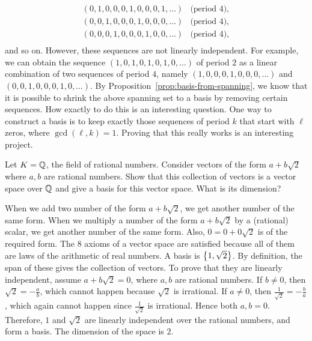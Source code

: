 \begin{ex}
\begin{sol}
\begin{enumerate}
\begin{equation*}
\begin{array}{ll}
          (0,1,0,0,0,1,0,0,0,1,\ldots) & \mbox{(period $4$)},\\
          (0,0,1,0,0,0,1,0,0,0,\ldots) & \mbox{(period $4$)},\\
          (0,0,0,1,0,0,0,1,0,0,\ldots) & \mbox{(period $4$)},\\
        \end{array}
      \end{equation*}
      and so on. However, these sequences are not linearly
      independent. For example, we can obtain the sequence
      $(1,0,1,0,1,0,1,0,\ldots)$ of period $2$ as a linear combination
      of two sequences of period $4$, namely
      $(1,0,0,0,1,0,0,0,\ldots)$ and $(0,0,1,0,0,0,1,0,\ldots)$. By
      Proposition~\ref{prop:basis-from-spanning}, we know that it is
      possible to shrink the above spanning set to a basis by removing
      certain sequences. How exactly to do this is an interesting
      question. One way to construct a basis is to keep exactly those
      sequences of period $k$ that start with $\ell$ zeros, where
      $\gcd(\ell,k)=1$. Proving that this really works is an
      interesting project.
    \end{enumerate}
  \end{sol}
\end{ex}

\begin{ex}
  Let $K=\mathbb{Q}$, the field of rational numbers. Consider vectors of the
  form $a+b\sqrt{2}$ where $a,b$ are rational numbers. Show that this
  collection of vectors is a vector space over $\mathbb{Q}$ and give a basis
  for this vector space. What is its dimension?
  \begin{sol}
    When we add two number of the form $a+b\sqrt{2}$, we get another
    number of the same form. When we multiply a number of the form
    $a+b\sqrt{2}$ by a (rational) scalar, we get another number of the
    same form. Also, $0=0+0\sqrt{2}$ is of the required form. The 8
    axioms of a vector space are satisfied because all of them are
    laws of the arithmetic of real numbers. A basis is
    $\left\{1,\sqrt{2}\right\}$. By definition, the span of these gives the
    collection of vectors. To prove that they are linearly
    independent, assume $a+b\sqrt{2}=0$, where $a,b$ are rational
    numbers. If $b\neq 0$, then $\sqrt{2}=-\frac{a}{b}$, which cannot
    happen because $\sqrt{2}$ is irrational. If $a\neq 0$, then
    $\frac{1}{\sqrt{2}}=-\frac{b}{a}$, which again cannot happen since
    $\frac{1}{\sqrt{2}}$ is irrational. Hence both $a,b=0$. Therefore,
    $1$ and $\sqrt{2}$ are linearly independent over the rational
    numbers, and form a basis. The dimension of the space is $2$.
  \end{sol}
\end{ex}
